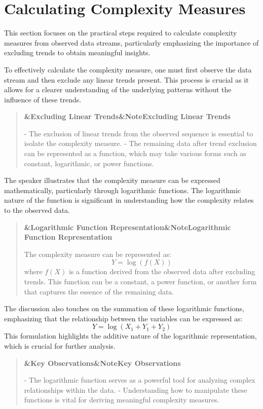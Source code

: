 \documentclass[a4paper]{article}
\newcommand{\boxheading}[1]{%
  \par\smallskip
  \noindent\textbf{\ifx&#1&Note\else#1\fi}\par
  \smallskip
}
\newenvironment{exbox}[1][]{%
  \begin{quote}\color{brown!70!black}\boxheading{#1}\normalcolor
}{\end{quote}}
\newenvironment{rembox}[1][]{%
  \begin{quote}\color{black!70}\boxheading{#1}\normalcolor
}{\end{quote}}
\begin{document}
\section{Calculating Complexity Measures}
This section focuses on the practical steps required to calculate complexity measures from observed data streams, particularly emphasizing the importance of excluding trends to obtain meaningful insights.

To effectively calculate the complexity measure, one must first observe the data stream and then exclude any linear trends present. This process is crucial as it allows for a clearer understanding of the underlying patterns without the influence of these trends.

\begin{rembox}[Excluding Linear Trends]
- The exclusion of linear trends from the observed sequence is essential to isolate the complexity measure.
- The remaining data after trend exclusion can be represented as a function, which may take various forms such as constant, logarithmic, or power functions.
\end{rembox}

The speaker illustrates that the complexity measure can be expressed mathematically, particularly through logarithmic functions. The logarithmic nature of the function is significant in understanding how the complexity relates to the observed data.

\begin{exbox}[Logarithmic Function Representation]
The complexity measure can be represented as:
\[
Y = \log(f(X))
\]
where \( f(X) \) is a function derived from the observed data after excluding trends. This function can be a constant, a power function, or another form that captures the essence of the remaining data.
\end{exbox}

The discussion also touches on the summation of these logarithmic functions, emphasizing that the relationship between the variables can be expressed as:
\[
Y = \log(X_1 + Y_1 + Y_2)
\]
This formulation highlights the additive nature of the logarithmic representation, which is crucial for further analysis.

\begin{rembox}[Key Observations]
- The logarithmic function serves as a powerful tool for analyzing complex relationships within the data.
- Understanding how to manipulate these functions is vital for deriving meaningful complexity measures.
\end{rembox}
\end{document}
